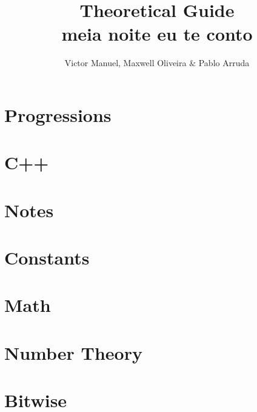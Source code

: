 \documentclass[10pt, twocolumn]{article}
\title{\vspace{-2cm}\textbf{Theoretical Guide\\meia noite eu te conto}}
\author{Victor Manuel, Maxwell Oliveira $\&$ Pablo Arruda}
\affil{\textit{Thanks to UFMG - Humuhumunukunukuapua'a}}
\date{}
\begin{document}
\maketitle\section{Progressions}


\section{C++}






\section{Notes}

\section{Constants}



\section{Math}






\section{Number Theory}









\section{Bitwise}


\end{document}
